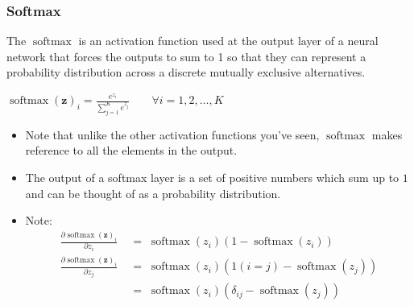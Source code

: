 \documentclass[\beamerclass]{beamer}
\DeclareMathOperator{\softmax}{softmax}
\begin{document}
\begin{frame}[fragile]\frametitle{Softmax}
The $\softmax$ is an activation function used at the output layer of a neural network that forces the outputs to sum to 1 so that they can represent a probability distribution across a discrete mutually exclusive alternatives.

\begin{center}
$\softmax(\bm z)_i = \frac{e^{z_i}}{\sum_{j=1}^K e^{z_j}} \;\;\;\;\;\;\; \forall i = 1, 2, \dots, K$  
\end{center}

\begin{itemize}
  \item Note that unlike the other activation functions you've seen, $\softmax$ makes reference to all the elements in the output.
  \item The output of a softmax layer is a set of positive numbers which sum up to $1$ and can be thought of as a probability distribution.
  \item Note:
  \begin{align*}
    {\frac{\partial \softmax(\bm z)_i }{\partial z_i}} \;&= \;{\softmax(z_i) (1 - \softmax(z_i))}\\
  {\frac{\partial \softmax(\bm z)_i }{\partial z_j} }\;&= \;{\softmax(z_i) ({1}(i=j) - \softmax(z_j)) }\\
  \;&= \;{\softmax(z_i) (\delta_{ij} - \softmax(z_j))}
  \end{align*}
  
\end{itemize}

\end{frame}

\end{document}
